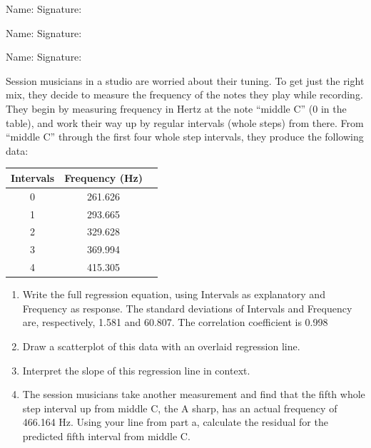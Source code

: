 \documentclass[11pt, chapterprefix=true]{scrbook}\usepackage[]{graphicx}\usepackage[]{color}
\begin{document}
\begin{exercises}
\begin{exercise}
\begin{center}
{{\vspace{4mm}
Name: \underline{\phantom{xxxxxxxxxxxxxxxxxxxxxxxx}} Signature: \underline{\phantom{xxxxxxxxxxxxxxxxxxxxxxxx}}

\vspace{4mm}
Name: \underline{\phantom{xxxxxxxxxxxxxxxxxxxxxxxx}} Signature: \underline{\phantom{xxxxxxxxxxxxxxxxxxxxxxxx}}

\vspace{4mm}
Name: \underline{\phantom{xxxxxxxxxxxxxxxxxxxxxxxx}} Signature: \underline{\phantom{xxxxxxxxxxxxxxxxxxxxxxxx}}
 }}
\end{center}

Session musicians in a studio are worried about their tuning. To get just the right mix, they decide to measure the frequency of the notes they play while recording. They begin by measuring frequency in Hertz at the note ``middle C'' (0 in the table), and work their way up by regular intervals (whole steps) from there. From ``middle C'' through the first four whole step intervals, they produce the following data:

\begin{center}
\begin{tabular}{@{} ccc @{}} \hline
Intervals &	Frequency (Hz) \\ \hline
0&	261.626 \\
1&	293.665 \\
2&	329.628 \\
3&	369.994 \\
4&	415.305 \\ \hline
\end{tabular}
\end{center}

\begin{enumerate}
  \item Write the full regression equation, using Intervals as explanatory and Frequency as response. The standard deviations of Intervals and Frequency are, respectively, 1.581 and 60.807. The correlation coefficient is 0.998
  \item Draw a scatterplot of this data with an overlaid regression line.
  \item	Interpret the slope of this regression line in context.
  \item	The session musicians take another measurement and find that the fifth whole step interval up from middle C, the A sharp, has an actual frequency of 466.164 Hz. Using your line from part a, calculate the residual for the predicted fifth interval from middle C.
\end{enumerate}


\end{exercise}
\end{exercises}
\end{document}
